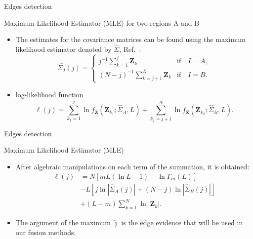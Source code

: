 \documentclass[10pt,professionalfonts]{beamer}
\begin{document}
\begin{frame}[fragile]{Edges detection}
\begin{alertblock}{Maximum Likelihood Estimator (MLE) for two regions A and B}
\begin{itemize}
\item The estimates for the covariance matrices can be found using the maximum likelihood estimator denoted by $\widehat{\Sigma}$, Ref.~\cite{good}: 
\begin{equation}
\widehat{\Sigma_{I}}(j) = \left\{
\begin{array}{lc}
	j^{-1}\sum_{k=1}^{j}\mathbf{Z}_{k}  & \mbox{if}\quad I=A,  \\
        (N-j)^{-1}\sum_{k=j+1}^{N}\mathbf{Z}_{k} & \mbox{if}\quad I=B.
\end{array}
\right.\label{eq_08}
\end{equation}
    \item log-likelihood function
\begin{equation}
\ell(j) =
	\sum_{k_1=1}^{j}\ln f_{\mathbf{Z}}(\mathbf{Z}_{k_1}; \widehat\Sigma_{A},L) + \sum_{k_2=j+1}^{N}\ln f_{\mathbf{Z}}(\mathbf{Z}_{k_2}; \widehat\Sigma_{B},L).
	\label{eq_07}
\end{equation}
\end{itemize}
\end{alertblock}
\end{frame}


\begin{frame}[fragile]{Edges detection}
\begin{alertblock}{Maximum Likelihood Estimator (MLE)}
\begin{itemize}
	\item After algebraic manipulations on each term of the summation, it is obtained:
\begin{align}\nonumber
	\ell(j)&=N\left[mL(\ln{L}-1)-\ln{\Gamma_m(L)}\right]\\\nonumber
	&- L\left[j\ln{|\widehat{\Sigma}_{A}(j)|} +(N-j)\ln{|\widehat{\Sigma}_{B}(j)|}\right] \\
	&+ (L-m)\sum_{k=1}^{N}\ln{|\mathbf{Z}_{k}|}.\label{eq_09}
\end{align}

\item The argument of the maximum $\widehat{\jmath}$ is the edge evidence that will be used in our fusion methods.
\end{itemize}
\end{alertblock}
\end{frame}
\end{document}
